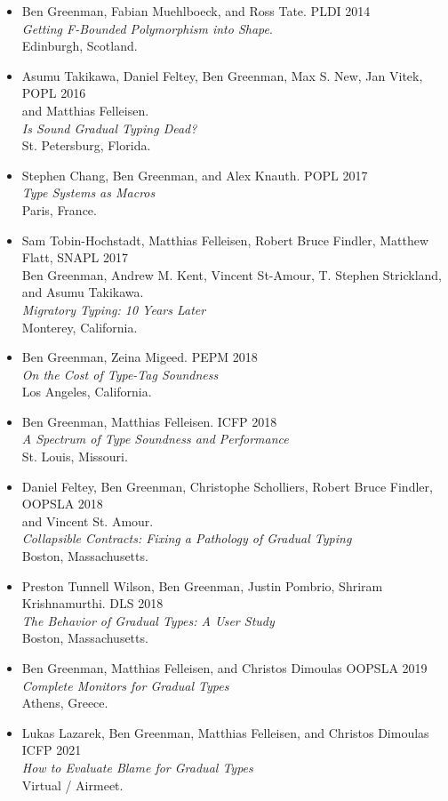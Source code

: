 \documentclass{article}
\begin{document}
\begin{itemize}
\item
  Ben Greenman, Fabian Muehlboeck, and Ross Tate. \hfill PLDI 2014 \\
  \emph{Getting F-Bounded Polymorphism into Shape}. \\
  Edinburgh, Scotland.
\item
  Asumu Takikawa, Daniel Feltey, Ben Greenman, Max S. New, Jan Vitek, \hfill POPL 2016 \\
   and Matthias Felleisen. \\
   \emph{Is Sound Gradual Typing Dead?} \\
  St. Petersburg, Florida.
\item
  Stephen Chang, Ben Greenman, and Alex Knauth. \hfill POPL 2017 \\
   \emph{Type Systems as Macros} \\
  Paris, France.
\item
  Sam Tobin-Hochstadt, Matthias Felleisen, Robert Bruce Findler, Matthew Flatt, \hfill SNAPL 2017 \\
  Ben Greenman, Andrew M. Kent, Vincent St-Amour, T. Stephen Strickland, \\
  and Asumu Takikawa. \\
  \emph{Migratory Typing: 10 Years Later} \\
  Monterey, California.
\item
  Ben Greenman, Zeina Migeed. \hfill PEPM 2018 \\
  \emph{On the Cost of Type-Tag Soundness} \\
  Los Angeles, California.
\item
  Ben Greenman, Matthias Felleisen. \hfill ICFP 2018 \\
  \emph{A Spectrum of Type Soundness and Performance} \\
  St. Louis, Missouri.
\item
  Daniel Feltey, Ben Greenman, Christophe Scholliers, Robert Bruce Findler, \hfill OOPSLA 2018 \\
  and Vincent St. Amour. \\
  \emph{Collapsible Contracts: Fixing a Pathology of Gradual Typing} \\
  Boston, Massachusetts.
\item
  Preston Tunnell Wilson, Ben Greenman, Justin Pombrio, Shriram Krishnamurthi. \hfill DLS 2018 \\
  \emph{The Behavior of Gradual Types: A User Study} \\
  Boston, Massachusetts.
\item
  Ben Greenman, Matthias Felleisen, and Christos Dimoulas \hfill OOPSLA 2019 \\
  \emph{Complete Monitors for Gradual Types} \\
  Athens, Greece.
\item
  Lukas Lazarek, Ben Greenman, Matthias Felleisen, and Christos Dimoulas \hfill ICFP 2021 \\
  \emph{How to Evaluate Blame for Gradual Types} \\
  Virtual / Airmeet.
\end{itemize}
\end{document}

